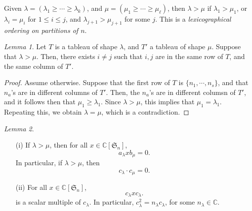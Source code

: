 \documentclass[a4paper]{report}
\theoremstyle{definition}
\theoremstyle{remark}
\theoremstyle{proposition}
\theoremstyle{conjecture}
\theoremstyle{lemma}
\newtheorem{lemma}{Lemma}
\theoremstyle{corollary}
\theoremstyle{exercise}
\theoremstyle{example}
\newcommand{\C}{\mathbb{C}}
\begin{document}
Given $\lambda = (\lambda_1 \geq \cdots\geq \lambda_k)$,
and $\mu = (\mu_1\geq \cdots \geq \mu_\ell)$,
then $\lambda > \mu$ if $\lambda_1 > \mu_1$, or $\lambda_i = \mu_i$
for $1\leq i \leq j$, and 
$\lambda_{j+1} > \mu_{j+1}$ for some $j$. This is a \emph{lexicographical
ordering on partitions of $n$}.

\begin{lemma}\label{lem8}
   Let $T$ is a tableau of shape $\lambda$, and $T'$ a tableau of shape $\mu$.
   Suppose that $\lambda > \mu$. Then, there exists $i\neq j$ such that 
   $i,j$ are in the same row of $T$, and the same column of $T'$.
\end{lemma}

\begin{proof}
    Assume otherwise. Suppose that the first row of $T$
    is $\lbrace n_1,\cdots,n_s\rbrace$, and that $n_a$'s are in 
    different columns of $T'$. Then, the $n_a$'s are in different columsn
    of $T'$, and it follows then that $\mu_1 \geq \lambda_1$.
    Since $\lambda > \mu$, this implies that $\mu_1 = \lambda_1$.
    Repeating this, we obtain $\lambda=\mu$, which is a contradiction.
\end{proof}

\begin{lemma}\label{lem9}
    \leavevmode
    \begin{itemize}
        \item[(i)] If $\lambda > \mu$, then for all $x \in \C[\mathfrak{S}_n]$,
            $$a_\lambda x b_\mu = 0.$$ In particular, if $\lambda > \mu$,
            then $$c_\lambda\cdot c_\mu = 0.$$
        \item[(ii)] For all $x \in \C[\mathfrak{S}_n]$, 
            $$c_\lambda x c_\lambda.$$ is a scalar multiple of $c_\lambda$.
            In particular, $c_\lambda^2 = n_\lambda c_\lambda$, for some 
            $n_\lambda \in \C$.
    \end{itemize}
\end{lemma}
\end{document}
